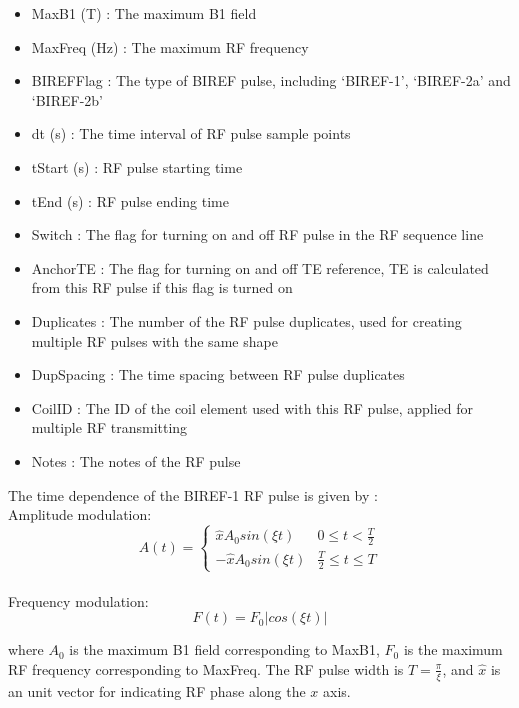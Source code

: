 \documentclass{book}%
\begin{document}
\begin{itemize}
	\item MaxB1 (T) : The maximum B1 field
	\item MaxFreq (Hz) : The maximum RF frequency
	\item BIREFFlag : The type of BIREF pulse, including `BIREF-1', `BIREF-2a' and `BIREF-2b'
	\item dt (s) : The time interval of RF pulse sample points
	\item tStart (s) : RF pulse starting time
	\item tEnd (s) : RF pulse ending time
	\item Switch : The flag for turning on and off RF pulse in the RF sequence line
	\item AnchorTE : The flag for turning on and off TE reference, TE is calculated from this RF pulse if this flag is turned on
	\item Duplicates : The number of the RF pulse duplicates, used for creating multiple RF pulses with the same shape
	\item DupSpacing : The time spacing between RF pulse duplicates
	\item CoilID : The ID of the coil element used with this RF pulse, applied for multiple RF transmitting
	\item Notes : The notes of the RF pulse 
\end{itemize}

The time dependence of the BIREF-1 RF pulse is given by \cite{Handbook2004}: \\
Amplitude modulation:
\begin{equation}
A(t) = 
\begin{cases}
 \hat{x} A_0 sin(\xi t)  &  0 \leq t < \frac{T}{2} \\
 -\hat{x} A_0 sin(\xi t)  &  \frac{T}{2} \leq t \leq T
\end{cases}
\label{eq:BIREF1A}
\end{equation}
\\
Frequency modulation:
\begin{equation}
F(t) = F_0 |cos(\xi t)|
\label{eq:BIREF1F}
\end{equation}

where $A_0$ is the maximum B1 field corresponding to MaxB1, $F_0$ is the maximum RF frequency corresponding to MaxFreq. The RF pulse width is $T = \frac{\pi}{\xi}$, and $\hat{x}$ is an unit vector for indicating RF phase along the $x$ axis. \\
\end{document}
